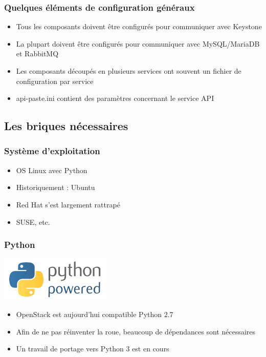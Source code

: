   \begin{frame}
    \frametitle{Quelques éléments de configuration généraux}
    \begin{itemize}
      \item Tous les composants doivent être configurés pour communiquer avec Keystone
      \item La plupart doivent être configurés pour communiquer avec MySQL/MariaDB et RabbitMQ
      \item Les composants découpés en plusieurs services ont souvent un fichier de configuration par service
      \item api-paste.ini contient des paramètres concernant le service API
    \end{itemize}
  \end{frame}

  \subsection[Les briques nécessaires]{Les briques nécessaires}
  \begin{frame}
    \frametitle{Système d'exploitation}
    \begin{itemize}
      \item OS Linux avec Python
      \item Historiquement : Ubuntu
      \item Red Hat s'est largement rattrapé
      \item SUSE, etc.
    \end{itemize}
  \end{frame}

  \begin{frame}
    \frametitle{Python}
    \begin{center}
      \includegraphics{images/python-powered.png}
    \end{center}
    \begin{itemize}
      \item OpenStack est aujourd'hui compatible Python 2.7
      \item Afin de ne pas réinventer la roue, beaucoup de dépendances sont nécessaires
      \item Un travail de portage vers Python 3 est en cours
    \end{itemize}
  \end{frame}

